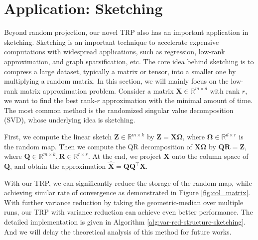 \section{Application: Sketching}
\label{appendix:sketching}
Beyond random projection, our novel TRP also has an important application in sketching. Sketching is an important technique to accelerate expensive computations with widespread applications, such as regression, low-rank approximation, and graph sparsification, etc. \citep{halko2011finding,woodruff2014sketching} 
The core idea behind sketching is to compress a large dataset, typically a matrix or tensor, into a smaller one by multiplying a random matrix. 
In this section, we will mainly focus on the low-rank matrix approximation problem. Consider a matrix $\mathbf{X} \in \mathbb{R}^{m \times d}$ with rank $r$, 
we want to find the best rank-$r$ approximation with the minimal amount of time. The most common method is the randomized singular value decomposition (SVD), whose underlying idea is sketching. 


First, we compute the linear sketch $\mathbf{Z} \in \mathbb{R}^{m \times k}$ by $\mathbf{Z} =\mathbf{X}\mathbf{\Omega}$, where $\mathbf{\Omega} \in \mathbb{R}^{d \times r}$ is the random map. Then we compute the QR decomposition of $\mathbf{X}\mathbf{\Omega}$ by $\mathbf{Q}\mathbf{R} = \mathbf{Z}$, where $\mathbf{Q} \in \mathbb{R}^{m \times k}, \mathbf{R} \in \mathbb{R}^{r \times r}$. At the end, we project $\mathbf{X}$ onto the column space of $\mathbf{Q}$, and obtain the approximation $\hat{\mathbf{X}} = \mathbf{Q} \mathbf{Q}^\top \mathbf{X}$.  

With our TRP, we can significantly reduce the storage of the random map, while achieving similar rate of convergence as demonstrated in Figure \ref{fig:col_matrix}. 
With further variance reduction by taking the geometric-median over multiple runs, our TRP with variance reduction can achieve even better performance. The detailed implementation is given in Algorithm \ref{alg:var-red-structure-sketching}. And we will delay the theoretical analysis of this method for future works. 


